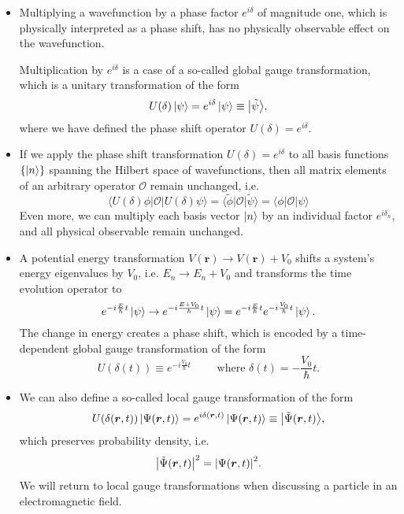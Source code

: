 \documentclass[11pt, a4paper]{article}
\renewcommand{\vec}[1]{\bm{#1}}  %
\renewcommand{\t}[1]{\tilde{#1}}
\renewcommand{\r}{\vec{r}}  %
\renewcommand{\O}{\mathcal{O}}  %
\newcommand{\p}{\psi}  %
\renewcommand{\P}{\Psi}  %
\newcommand{\bket}[1]{\big | {#1} \big \rangle }
\newcommand{\bmel}[3]{\big \langle {#1} \big | {#2} \big | {#3} \big \rangle}  %
\renewcommand{\k}[1]{\ket{#1}}
\begin{document}

\begin{itemize}
	\item Multiplying a wavefunction by a phase factor $ e^{i\delta} $ of magnitude one, which is physically interpreted as a phase shift, has no physically observable effect on the wavefunction. 

    Multiplication by $ e^{i\delta} $ is a case of a so-called global gauge transformation, which is a unitary transformation of the form
	\begin{equation*}
		U(\delta)\ket{\psi} = e^{i\delta}\ket{\p} \equiv \bket{\tilde{\p}},
	\end{equation*}
    where we have defined the phase shift operator $ U(\delta) = e^{i \delta} $.
	
    \item If we apply the phase shift transformation $ U(\delta) = e^{i\delta} $ to all basis functions $ \{\ket{n}\} $ spanning the Hilbert space of wavefunctions, then all matrix elements of an arbitrary operator $ \O $ remain unchanged, i.e. 
	\begin{equation*}
		\bmel{U(\delta) \phi}{\O}{U(\delta)\p} = \bmel{\t{\phi}}{\O}{\t{\p}} = \bmel{\phi}{\O}{\p} 
	\end{equation*}
	Even more, we can multiply each basis vector $ \ket{n} $ by an individual factor $ e^{i \delta_{n}} $, and all physical observable remain unchanged.
	
	\item A potential energy transformation $ V(\r) \to V(\r) + V_{0} $ shifts a system's energy eigenvalues by $ V_{0} $, i.e. $ E_{n} \to E_{n} + V_{0} $ and transforms the time evolution operator to
	\begin{equation*}
		e^{-i\frac{E}{\hbar}t}\k{\p} \to e^{-i\frac{E+V_{0}}{\hbar}t}\k{\p} = e^{-i\frac{E}{\hbar}t} e^{-i\frac{V_{0}}{\hbar}t}  \k{\p}.
	\end{equation*}
    The change in energy creates a phase shift, which is encoded by a time-dependent global gauge transformation of the form
	\begin{equation*}
		U(\delta(t)) \equiv e^{-i\frac{V_{0}}{\hbar}t} \qquad \text{ where } \delta(t) = -\frac{V_{0}}{\hbar}t.
	\end{equation*}
	
	\item We can also define a so-called local gauge transformation of the form
	\begin{equation*}
		U(\delta(\r, t)) \ket{\P(\r, t)} = e^{i\delta(\r, t)}\ket{\P(\r, t)} \equiv \bket{\t{\P}(\r, t)},
	\end{equation*}
	which preserves probability density, i.e.
	\begin{equation*}
		\big|\t{\P}(\r, t) \big|^{2} = \abs{\P(\r, t)}^{2}.
	\end{equation*}
	We will return to local gauge transformations when discussing a particle in an electromagnetic field. 
\end{itemize}
\end{document}
